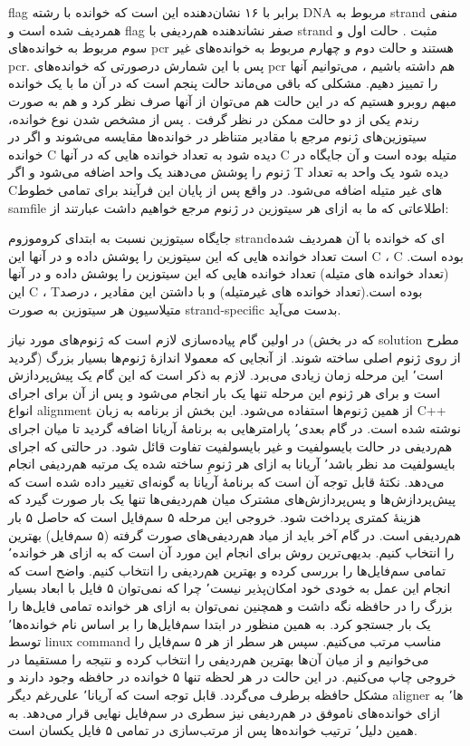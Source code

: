 flag برابر با ۱۶ نشان‌دهنده این است که خوانده با رشته DNA مربوط به strand منفی همردیف شده است و flag صفر نشاندهنده هم‌ردیفی با strand مثبت . حالت اول و سوم مربوط به خوانده‌های pcr هستند و حالت دوم و چهارم مربوط به خوانده‌های غیر pcr. پس با این شمارش درصورتی که خوانده‌های pcr هم داشته باشیم ، می‌توانیم آنها را تمییز دهیم. مشکلی که باقی می‌ماند حالت پنجم است که در آن ما با یک خوانده مبهم روبرو هستیم که در این حالت هم می‌توان از آنها صرف نظر کرد و هم به صورت رندم یکی از دو حالت ممکن در نظر گرفت .
پس از مشخص شدن نوع خوانده، سیتوزین‌های ژنوم مرجع با مقادیر متناظر در خوانده‌ها مقایسه می‌شوند و اگر در خوانده C دیده شود به تعداد خوانده هایی که در آنها C متیله بوده است و آن جایگاه در ژنوم را پوشش می‌دهند یک واحد اضافه می‌شود و اگر T دیده شود یک واحد به تعداد Cهای غیر متیله اضافه می‌شود. در واقع پس از پایان این فرآیند برای تمامی خطوط samfile اطلاعاتی که ما به ازای هر سیتوزین در ژنوم مرجع خواهیم داشت عبارتند از:

 جایگاه سیتوزین نسبت به ابتدای کروموزوم
 strandای که خوانده با آن همردیف شده است 
 تعداد خوانده هایی که این سیتوزین را پوشش داده و در آنها این C ، C بوده است.(تعداد خوانده های متیله)
 تعداد خوانده هایی که این سیتوزین را پوشش داده و در آنها این C ،  Tبوده است.(تعداد خوانده های غیرمتیله)
و با داشتن این مقادیر ، درصد متیلاسیون هر سیتوزین به صورت strand-specific بدست می‌آید.


در اولین گام پیاده‌سازی لازم است که ژنوم‌های مورد نیاز (که در بخش solution مطرح گردید) از روی ژنوم اصلی ساخته شوند. از آنجایی که معمولا اندازهٔ ژنوم‌ها بسیار بزرگ است٬ این مرحله زمان زیادی می‌برد. لازم به ذکر است که این گام یک پیش‌پردازش است و برای هر ژنوم این مرحله تنها یک بار انجام می‌شود و پس از آن برای اجرای انواع alignment از همین ژنوم‌ها استفاده می‌شود. این بخش از برنامه به زبان C++ نوشته شده است.
در گام بعدی٬ پارامترهایی به برنامهٔ آریانا اضافه گردید تا میان اجرای هم‌ردیفی در حالت بایسولفیت و غیر بایسولفیت تفاوت قائل شود. در حالتی که اجرای بایسولفیت مد نظر باشد٬ آریانا به ازای هر ژنومِ ساخته شده یک مرتبه هم‌ردیفی انجام می‌دهد. نکتهٔ قابل توجه آن است که برنامهٔ آریانا به گونه‌ای تغییر داده شده است که پیش‌پردازش‌ها و پس‌پردازش‌های مشترک میان هم‌ردیفی‌ها تنها یک بار صورت گیرد که هزینهٔ کمتری پرداخت شود. خروجی این مرحله ۵ سم‌فایل است که حاصل ۵ بار هم‌ردیفی است.
در گام آخر باید از میاد هم‌ردیفی‌های صورت گرفته (۵ سم‌فایل) بهترین را انتخاب کنیم. بدیهی‌ترین روش برای انجام این مورد آن است که به ازای هر خوانده٬ تمامی سم‌فایل‌ها را بررسی کرده و بهترین هم‌ردیفی را انتخاب کنیم. واضح است که انجام این عمل به خودی خود امکان‌پذیر نیست٬ چرا که نمی‌توان ۵ فایل با ابعاد بسیار بزرگ را در حافظه نگه داشت و همچنین نمی‌توان به ازای هر خوانده تمامی فایل‌ها را یک بار جستجو کرد. به همین منظور در ابتدا سم‌فایل‌ها را بر اساس نام خوانده‌ها٬ توسط linux command مناسب مرتب می‌کنیم. سپس هر سطر از هر ۵ سم‌فایل را می‌خوانیم و از میان آن‌ها بهترین هم‌ردیفی را انتخاب کرده و نتیجه را مستقیما در خروجی چاپ می‌کنیم. در این حالت در هر لحظه تنها ۵ خوانده در حافظه وجود دارند و مشکل حافظه برطرف می‌گردد. قابل توجه است که آریانا٬ علی‌رغم دیگر aligner ها٬ به ازای خوانده‌های ناموفق در هم‌ردیفی نیز سطری در سم‌فایل نهایی قرار می‌دهد. به همین دلیل٬ ترتیب خوانده‌ها پس از مرتب‌سازی در تمامی ۵ فایل یکسان است.

